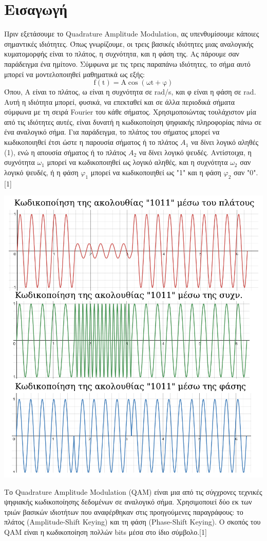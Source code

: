 \documentclass{article}
\begin{document}
\section{Εισαγωγή}
\large
Πριν εξετάσουμε το Quadrature Amplitude Modulation, ας υπενθυμίσουμε κάποιες σημαντικές ιδιότητες. Όπως γνωρίζουμε, οι τρεις βασικές ιδιότητες μιας αναλογικής κυματομορφής είναι το πλάτος, η συχνότητα, και η φάση της. Ας πάρουμε σαν παράδειγμα ένα ημίτονο. Σύμφωνα με τις τρεις παραπάνω ιδιότητες, το σήμα αυτό μπορεί να μοντελοποιηθεί μαθηματικά ως εξής:
\Large
$$\mathrm{f(t)}=\mathrm{A}\cos(\mathrm{ωt+φ})$$
\large
Όπου, Α είναι το πλάτος, ω είναι η συχνότητα σε rad/s, και φ είναι η φάση σε rad. Αυτή η ιδιότητα μπορεί, φυσικά, να επεκταθεί και σε άλλα περιοδικά σήματα σύμφωνα με τη σειρά Fourier του κάθε σήματος. Χρησιμοποιώντας τουλάχιστον μία από τις ιδιότητες αυτές, είναι δυνατή η κωδικοποίηση ψηφιακής πληροφορίας πάνω σε ένα αναλογικό σήμα. Για παράδειγμα, το πλάτος του σήματος μπορεί να κωδικοποιηθεί έτσι ώστε η παρουσία σήματος ή το πλάτος $A_{1}$ να δίνει λογικό αληθές (1), ενώ η απουσία σήματος ή το πλάτος $A_{2}$ να δίνει λογικό ψευδές. Αντίστοιχα, η συχνότητα $ω_{1}$ μπορεί να κωδικοποιηθεί ως λογικό αληθές, και η συχνότητα $ω_{2}$ σαν λογικό ψευδές, ή η φάση $φ_{1}$ μπορεί να κωδικοποιηθεί ως "1" και η φάση $φ_{2}$ σαν "0".[1]\\
\begin{center}
    \includegraphics[scale=0.4]{diktya_pic1.png}
\end{center}
Το Quadrature Amplitude Modulation (QAM) είναι μια από τις σύγχρονες τεχνικές ψηφιακής κωδικοποίησης δεδομένων σε αναλογικό σήμα. Χρησιμοποιεί δύο εκ των τριών βασικών ιδιοτήτων που αναφέρθηκαν στις προηγούμενες παραγράφους: το πλάτος (Amplitude-Shift Keying) και τη φάση (Phase-Shift Keying). Ο σκοπός του QAM είναι η κωδικοποίηση πολλών bits μέσα στο ίδιο σύμβολο.[1]
\end{document}
